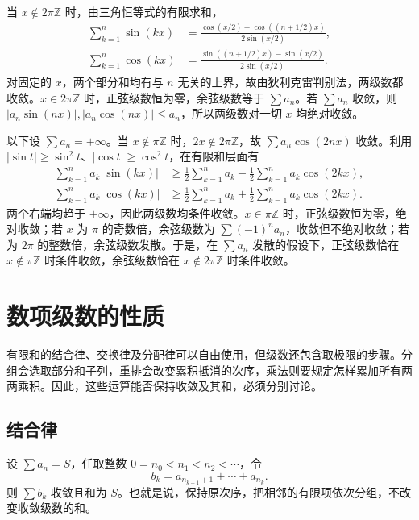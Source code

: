 \begin{solve}
当 $x\notin2\pi\mathbb Z$ 时，由三角恒等式的有限求和，
\begin{align*}
    \sum_{k=1}^n\sin(kx)
       &=\frac{\cos(x/2)-\cos((n+1/2)x)}{2\sin(x/2)},\\
    \sum_{k=1}^n\cos(kx)
       &=\frac{\sin((n+1/2)x)-\sin(x/2)}{2\sin(x/2)}.
\end{align*}
对固定的 $x$，两个部分和均有与 $n$ 无关的上界，故由狄利克雷判别法，两级数都收敛。$x\in2\pi\mathbb Z$ 时，正弦级数恒为零，余弦级数等于 $\sum a_n$。若 $\sum a_n$ 收敛，则 $|a_n\sin(nx)|,|a_n\cos(nx)|\leq a_n$，所以两级数对一切 $x$ 均绝对收敛。

以下设 $\sum a_n=+\infty$。当 $x\notin\pi\mathbb Z$ 时，$2x\notin2\pi\mathbb Z$，故 $\sum a_n\cos(2nx)$ 收敛。利用 $|\sin t|\geq\sin^2t$、$|\cos t|\geq\cos^2t$，在有限和层面有
\begin{align*}
    \sum_{k=1}^n a_k|\sin(kx)|
       &\geq\frac12\sum_{k=1}^n a_k
             -\frac12\sum_{k=1}^n a_k\cos(2kx),\\
    \sum_{k=1}^n a_k|\cos(kx)|
       &\geq\frac12\sum_{k=1}^n a_k
             +\frac12\sum_{k=1}^n a_k\cos(2kx).
\end{align*}
两个右端均趋于 $+\infty$，因此两级数均条件收敛。$x\in\pi\mathbb Z$ 时，正弦级数恒为零，绝对收敛；若 $x$ 为 $\pi$ 的奇数倍，余弦级数为 $\sum(-1)^na_n$，收敛但不绝对收敛；若为 $2\pi$ 的整数倍，余弦级数发散。于是，在 $\sum a_n$ 发散的假设下，正弦级数恰在 $x\notin\pi\mathbb Z$ 时条件收敛，余弦级数恰在 $x\notin2\pi\mathbb Z$ 时条件收敛。
\end{solve}

\section{数项级数的性质}
\label{sec:properties-of-numerical-series}

有限和的结合律、交换律及分配律可以自由使用，但级数还包含取极限的步骤。分组会选取部分和子列，重排会改变累积抵消的次序，乘法则要规定怎样累加所有两两乘积。因此，这些运算能否保持收敛及其和，必须分别讨论。

\subsection{结合律}
\label{subsec:associativity-of-series}

\begin{theorem}[收敛级数的分组]
\label{thm:grouping-convergent-series}
设 $\sum a_n=S$，任取整数 $0=n_0<n_1<n_2<\cdots$，令
\[
    b_k=a_{n_{k-1}+1}+\cdots+a_{n_k}.
\]
则 $\sum b_k$ 收敛且和为 $S$。也就是说，保持原次序，把相邻的有限项依次分组，不改变收敛级数的和。
\end{theorem}

